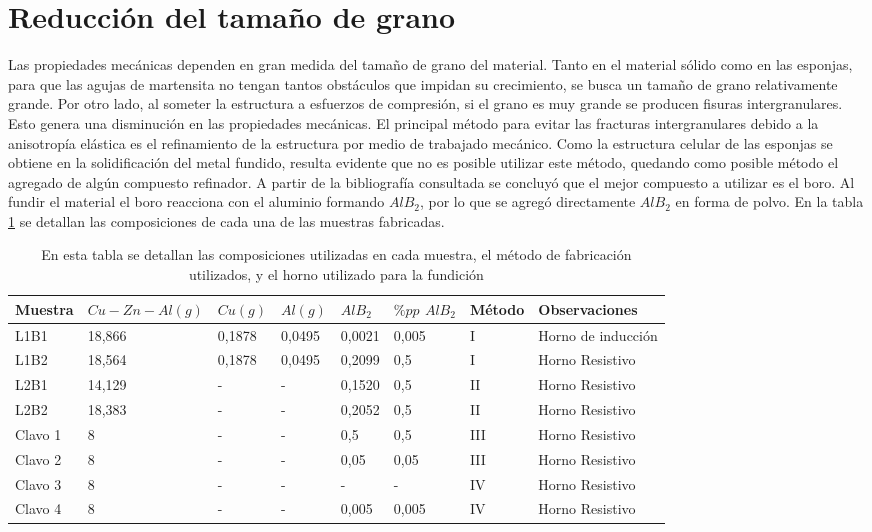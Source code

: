 \documentclass[a4paper,12pt,fleqn,twoside,openany]{book}
\begin{document}
\section{Reducción del tamaño de grano} \label{FabClavos}


Las propiedades mecánicas dependen en gran medida del tamaño de grano del material. Tanto en el material sólido como en las esponjas, para que las agujas de martensita no tengan tantos obstáculos que impidan su crecimiento, se busca un tamaño de grano relativamente grande. Por otro 
lado, al someter la estructura a esfuerzos de compresión, si el grano es muy grande se producen fisuras intergranulares. Esto genera 
una disminución en las propiedades mecánicas. El principal método para evitar las fracturas intergranulares debido a la anisotropía elástica es el refinamiento de la estructura por medio de trabajado mecánico. Como la estructura 
celular de las esponjas se obtiene en la solidificación del metal fundido, resulta evidente que no es posible utilizar este método, quedando como posible método el agregado de algún compuesto refinador. A partir de la bibliografía consultada se concluyó que el 
mejor compuesto a utilizar es el boro. Al fundir el material el boro reacciona con el aluminio formando $AlB_2$, por lo que se agregó directamente $AlB_2$ en forma de polvo. En la tabla \ref{tab:FabMuestras} se detallan las composiciones de cada una de las muestras fabricadas. 

\begin{table} %
\begin{center}
\begin{tabular}{@{}llllllll@{}}  \toprule
Muestra & $Cu-Zn-Al (g)$ & $Cu (g)$ & $Al (g)$ & $AlB_2$ & $\% pp$ $AlB_2$ & Método & Observaciones \\ \midrule
L1B1 & 18,866  & 0,1878 & 0,0495 & 0,0021 & 0,005 & I & Horno de inducción\\
L1B2 & 18,564  & 0,1878 & 0,0495 & 0,2099 & 0,5 & I &Horno Resistivo\\
L2B1 & 14,129  & - & -  & 0,1520 & 0,5 & II &Horno Resistivo \\
L2B2 & 18,383 & - & -  & 0,2052 & 0,5 &II & Horno Resistivo \\
Clavo 1 & 8 & - & - & 0,5 & 0,5 & III & Horno Resistivo \\
Clavo 2 & 8 & - & - & 0,05 & 0,05 &III & Horno Resistivo \\
Clavo 3 & 8 & - & - & - & - &  IV & Horno Resistivo \\
Clavo 4 & 8 & - & - & 0,005 & 0,005 &IV & Horno Resistivo \\
\bottomrule
\end{tabular}
\caption{En esta tabla se detallan las composiciones utilizadas en cada muestra, el método de fabricación utilizados, y el horno utilizado para la fundición}
\label{tab:FabMuestras}
\end{center}
\end{table}
\end{document}
